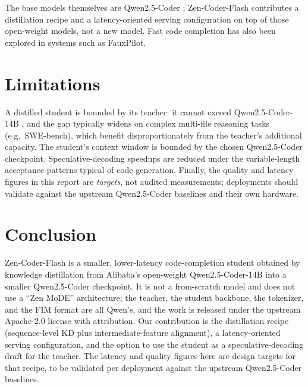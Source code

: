 \documentclass[11pt,a4paper]{article}
\begin{document}
The base models themselves are Qwen2.5-Coder \cite{qwen25coder}; Zen-Coder-Flash contributes a
distillation recipe and a latency-oriented serving configuration on top of those open-weight models,
not a new model. Fast code completion has also been explored in systems such as FauxPilot.

\section{Limitations}

A distilled student is bounded by its teacher: it cannot exceed Qwen2.5-Coder-14B
\cite{qwen25coder}, and the gap typically widens on complex multi-file reasoning tasks (e.g.\
SWE-bench), which benefit disproportionately from the teacher's additional capacity. The student's
context window is bounded by the chosen Qwen2.5-Coder checkpoint. Speculative-decoding speedups are
reduced under the variable-length acceptance patterns typical of code generation. Finally, the quality
and latency figures in this report are \emph{targets}, not audited measurements; deployments should
validate against the upstream Qwen2.5-Coder baselines and their own hardware.

\section{Conclusion}

Zen-Coder-Flash is a smaller, lower-latency code-completion student obtained by knowledge distillation
from Alibaba's open-weight Qwen2.5-Coder-14B \cite{qwen25coder} into a smaller Qwen2.5-Coder checkpoint.
It is not a from-scratch model and does not use a ``Zen MoDE'' architecture; the teacher, the student
backbone, the tokenizer, and the FIM format are all Qwen's, and the work is released under the upstream
Apache-2.0 license with attribution. Our contribution is the distillation recipe (sequence-level KD plus
intermediate-feature alignment), a latency-oriented serving configuration, and the option to use the
student as a speculative-decoding draft for the teacher. The latency and quality figures here are design
targets for that recipe, to be validated per deployment against the upstream Qwen2.5-Coder baselines.
\end{document}

